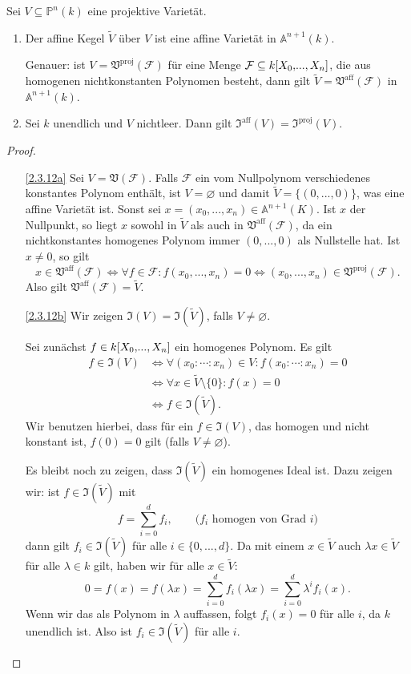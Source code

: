 \documentclass[a4paper,12pt,index=toc]{scrbook}
\theoremstyle{keinenummern} %
\def\A{\mathbb{A}}
\def\V{\mathfrak{V}}
\def\I{\mathfrak{I}}
\def\P{\mathbb{P}}
\newcommand{\F}{\mathcal{F}}
\newcommand{\leer}{\ensuremath{\varnothing}}
\renewcommand{\dotsc}{\ensuremath{\!...}}
\newcommand{\schlange}[1]{\widetilde{#1}}
\newcommand{\ppolyx}[1][n]{\ensuremath%
  [X_{0},\dotsc,X_{#1}]}
\begin{document}
\begin{prop}\label{2.3.12prop}
  Sei $V\subseteq\P^n(k)$ eine projektive Varietät.
  \begin{enumerate}
  \item{} Der affine Kegel $\schlange{V}$ über $V$ ist eine affine Varietät in $\A^{n+1}(k)$. 
  
  Genauer: ist
    $V=\V^{\mathrm{proj}}(\F)$ für eine Menge $\F\subseteq k\ppolyx$, die aus homogenen nichtkonstanten Polynomen besteht, dann
    gilt $\schlange{V}=\V^{\mathrm{aff}}(\F)$ in $\A^{n+1}(k)$.
  \item{} Sei $k$ unendlich und $V$ nichtleer. Dann gilt $\I^{\mathrm{aff}}(V)=\I^{\mathrm{proj}}(V)$.
  \end{enumerate}
\end{prop}
\begin{proof}
  \begin{enumerate}
  \item[\ref{2.3.12a}] Sei $V=\V(\F)$. Falls $\F$ ein vom Nullpolynom verschiedenes konstantes Polynom enthält, ist $V=\leer$
    und damit $\schlange{V}=\{(0,\dotsc,0)\}$, was eine affine Varietät ist. Sonst sei $x=(x_0,\dotsc,x_n)\in\A^{n+1}(K)$. Ist $x$
    der Nullpunkt, so liegt $x$ sowohl in $\schlange{V}$ als auch in $\V^{\mathrm{aff}}(\F)$, da ein nichtkonstantes homogenes
    Polynom immer $(0,\dotsc,0)$ als Nullstelle hat. Ist $x\neq0$, so gilt
    \[ x\in\V^{\mathrm{aff}}(\F) \iff \forall f\in\F\colon f(x_0,\dotsc,x_n)=0 \iff
    (x_0,\dotsc,x_n)\in\V^{\mathrm{proj}}(\F). \]
    Also gilt $\V^{\mathrm{aff}}(\F)=\schlange{V}$.
  \item[\ref{2.3.12b}] Wir zeigen $\I(V)=\I(\schlange{V})$, falls $V\neq\leer$.

    Sei zunächst $f\in k\ppolyx$ ein homogenes Polynom. Es gilt
    \begin{align*}
      f\in\I(V) &\iff \forall (x_0:\dotsm:x_n)\in V\colon f(x_0:\dotsm:x_n)=0 \\ &\iff \forall x\in\schlange{V}\setminus\{0\}\colon
      f(x)=0 \\ &\iff f\in\I(\schlange{V}).
    \end{align*}
    Wir benutzen hierbei, dass für ein $f\in\I(V)$, das homogen und nicht konstant ist, $f(0)=0$ gilt (falls $V\neq\leer$).

    Es bleibt noch zu zeigen, dass $\I(\schlange{V})$ ein homogenes Ideal ist. Dazu zeigen wir: ist $f\in\I(\schlange{V})$ mit
    \[ f=\sum_{i=0}^d f_i, \qquad \text{(}f_i\text{ homogen von Grad }i\text{)} \] dann gilt $f_i\in\I(\schlange{V})$ für alle
    $i\in\{0,\dotsc,d\}$. Da mit einem $x\in\schlange{V}$ auch $\lambda x\in\schlange{V}$ für alle $\lambda\in k$ gilt, haben wir für
    alle $x\in\schlange{V}$: \[ 0=f(x)=f(\lambda x)=\sum_{i=0}^d f_i(\lambda x) = \sum_{i=0}^d \lambda^i f_{i}(x). \] Wenn wir das als
    Polynom in $\lambda$ auffassen, folgt $f_i(x)=0$ für alle $i$, da $k$ unendlich ist. Also ist $f_i\in\I(\schlange{V})$ für alle $i$.
  \end{enumerate}
\end{proof}
\end{document}
